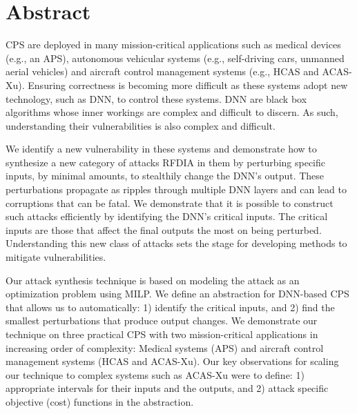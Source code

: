 
\chapter{Abstract}

\ac{CPS} are deployed in many mission-critical applications such as medical devices (e.g., an \ac{APS}), autonomous vehicular systems (e.g., self-driving cars, unmanned aerial vehicles) and aircraft control management systems (e.g.,  \ac{HCAS} and \ac{ACAS-Xu}). 
Ensuring correctness is becoming more difficult as these systems adopt new technology, such as \ac{DNN}, to control these systems. 
\ac{DNN} are black box algorithms whose inner workings are complex and difficult to discern.
As such, understanding their vulnerabilities is also complex and difficult. 

We identify a new vulnerability in these systems and demonstrate how to synthesize a new category of attacks \ac{RFDIA} in them by perturbing specific inputs, by minimal amounts, to stealthily change the \ac{DNN}'s output. 
 These perturbations propagate as ripples through multiple \ac{DNN} layers and can lead to corruptions that can be fatal. 
We demonstrate that it is possible  to construct such attacks efficiently by identifying the \ac{DNN}'s critical inputs. 
The critical inputs are those that  affect the final outputs the most on being perturbed. 
Understanding this new class of attacks sets the stage for developing methods to mitigate vulnerabilities. 

Our attack synthesis technique is based on modeling the attack as an optimization problem using \ac{MILP}.
We define an abstraction for \ac{DNN}-based \ac{CPS} that allows us to automatically: 1) identify the critical inputs, and 2) find the smallest perturbations that produce output changes. 
We demonstrate our technique on three practical \ac{CPS} with two mission-critical applications in increasing order of complexity: Medical systems (\ac{APS}) and aircraft control management systems (\ac{HCAS} and \ac{ACAS-Xu}). 
Our key observations for scaling our technique to complex systems such as \ac{ACAS-Xu} were to define: 1) appropriate intervals for their inputs and the outputs, and 2) attack specific objective (cost) functions in the abstraction.  
 



